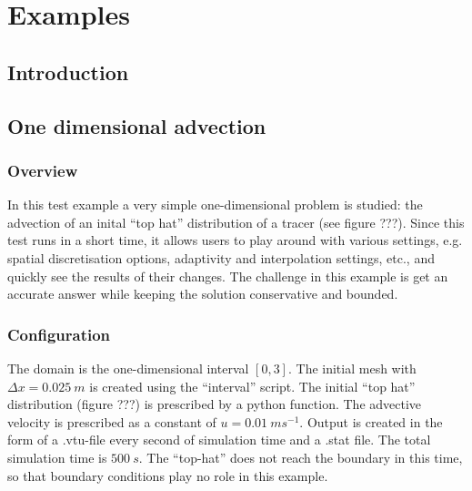 \chapter{Examples}
\label{chap:examples}
\section{Introduction}
\label{sect:examples_introduction}


\section{One dimensional advection}
\label{sect:oned_advection}
\subsection{Overview}
In this test example a very simple one-dimensional problem is 
studied: the advection of an inital ``top hat'' distribution 
of a tracer (see figure ???). Since this test runs in a  
short time, it allows users to play around with various
settings, e.g. spatial discretisation options, adaptivity 
and interpolation settings, etc., and quickly see the results
of their changes. The challenge in this example is get an accurate
answer while keeping the solution conservative and bounded.

\subsection{Configuration}
The domain is the one-dimensional interval $[0,3]$. The initial 
mesh with $\Delta x=0.025~m$ is created using the ``interval'' 
script. The initial ``top hat'' distribution (figure ???) is 
prescribed by a python function. The advective velocity is 
prescribed as a constant of $u=0.01~ms^{-1}$. Output is created
in the form of a .vtu-file every second of simulation time
and a .stat file. The total simulation time is $500~s$. 
The ``top-hat'' does not reach the boundary in this time, so that
boundary conditions play no role in this example.

